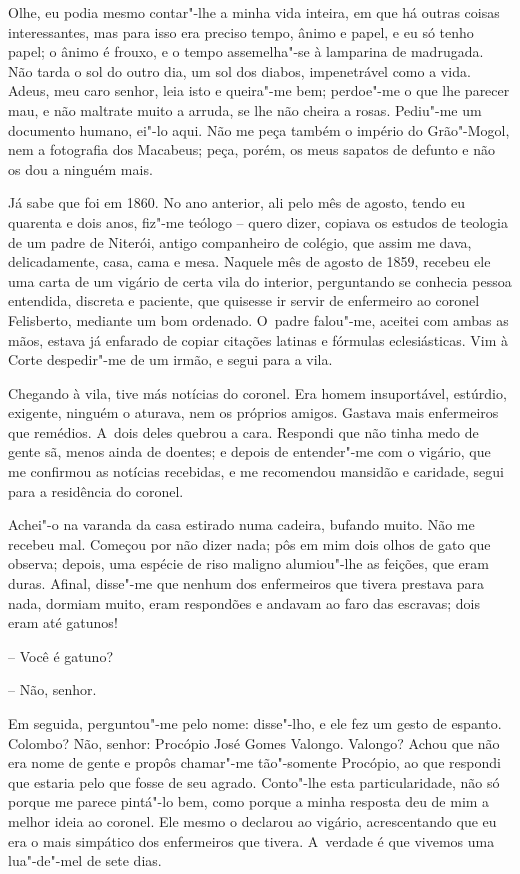 Olhe, eu podia mesmo contar"-lhe a minha vida inteira, em que há outras
coisas interessantes, mas para isso era preciso tempo, ânimo e papel, e
eu só tenho papel; o ânimo é frouxo, e o tempo assemelha"-se à lamparina
de madrugada. Não tarda o sol do outro dia, um sol dos diabos,
impenetrável como a vida. Adeus, meu caro senhor, leia isto e queira"-me
bem; perdoe"-me o que lhe parecer mau, e não maltrate muito a arruda, se
lhe não cheira a rosas. Pediu"-me um documento humano, ei"-lo aqui. Não me
peça também o império do Grão"-Mogol, nem a fotografia dos Macabeus;
peça, porém, os meus sapatos de defunto e não os dou a ninguém mais.

Já sabe que foi em 1860. No ano anterior, ali pelo mês de agosto, tendo
eu quarenta e dois anos, fiz"-me teólogo -- quero dizer, copiava os
estudos de teologia de um padre de Niterói, antigo companheiro de
colégio, que assim me dava, delicadamente, casa, cama e mesa. Naquele
mês de agosto de 1859, recebeu ele uma carta de um vigário de certa vila
do interior, perguntando se conhecia pessoa entendida, discreta e
paciente, que quisesse ir servir de enfermeiro ao coronel Felisberto,
mediante um bom ordenado. O~padre falou"-me, aceitei com ambas as mãos,
estava já enfarado de copiar citações latinas e fórmulas eclesiásticas.
Vim à Corte despedir"-me de um irmão, e segui para a vila.

Chegando à vila, tive más notícias do coronel. Era homem insuportável,
estúrdio, exigente, ninguém o aturava, nem os próprios amigos. Gastava
mais enfermeiros que remédios. A~dois deles quebrou a cara. Respondi que
não tinha medo de gente sã, menos ainda de doentes; e depois de
entender"-me com o vigário, que me confirmou as notícias recebidas, e me
recomendou mansidão e caridade, segui para a residência do coronel.

Achei"-o na varanda da casa estirado numa cadeira, bufando muito. Não me
recebeu mal. Começou por não dizer nada; pôs em mim dois olhos de gato
que observa; depois, uma espécie de riso maligno alumiou"-lhe as feições,
que eram duras. Afinal, disse"-me que nenhum dos enfermeiros que tivera
prestava para nada, dormiam muito, eram respondões e andavam ao faro das
escravas; dois eram até gatunos!

-- Você é gatuno?

-- Não, senhor.

Em seguida, perguntou"-me pelo nome: disse"-lho, e ele fez um gesto de
espanto. Colombo? Não, senhor: Procópio José Gomes Valongo. Valongo?
Achou que não era nome de gente e propôs chamar"-me tão"-somente Procópio,
ao que respondi que estaria pelo que fosse de seu agrado. Conto"-lhe esta
particularidade, não só porque me parece pintá"-lo bem, como porque a
minha resposta deu de mim a melhor ideia ao coronel. Ele mesmo o
declarou ao vigário, acrescentando que eu era o mais simpático dos
enfermeiros que tivera. A~verdade é que vivemos uma lua"-de"-mel de sete
dias.

